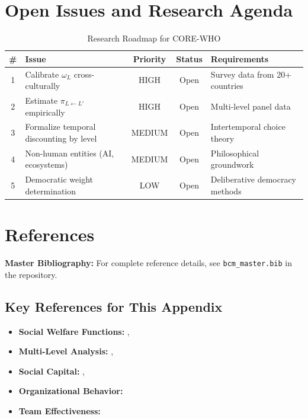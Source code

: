 \section{Open Issues and Research Agenda}
\label{sec:who-open}

\begin{table}[htbp]
\centering
\caption{Research Roadmap for CORE-WHO}
\label{tab:who-roadmap}
\renewcommand{\arraystretch}{1.3}
\begin{tabular}{@{}clccl@{}}
\toprule
\textbf{\#} & \textbf{Issue} & \textbf{Priority} & \textbf{Status} & \textbf{Requirements} \\
\midrule
1 & Calibrate $\omega_L$ cross-culturally & HIGH & Open & Survey data from 20+ countries \\
2 & Estimate $\pi_{L \leftarrow L'}$ empirically & HIGH & Open & Multi-level panel data \\
3 & Formalize temporal discounting by level & MEDIUM & Open & Intertemporal choice theory \\
4 & Non-human entities (AI, ecosystems) & MEDIUM & Open & Philosophical groundwork \\
5 & Democratic weight determination & LOW & Open & Deliberative democracy methods \\
\bottomrule
\end{tabular}
\end{table}


\section{References}
\label{sec:who-references}

\begin{tcolorbox}[colback=blue!5!white, colframe=blue!75!black]
\textbf{Master Bibliography:} For complete reference details, see
\texttt{bcm\_master.bib} in the repository.
\end{tcolorbox}

\subsection{Key References for This Appendix}

\begin{itemize}[nosep]
\item \textbf{Social Welfare Functions:} \citet{sen1970collective}, \citet{arrow1951social}
\item \textbf{Multi-Level Analysis:} \citet{coleman1990foundations}, \citet{raudenbush2002hierarchical}
\item \textbf{Social Capital:} \citet{putnam2000bowling}, \citet{coleman1988social}
\item \textbf{Organizational Behavior:} \citet{kozlowski2000multilevel}
\item \textbf{Team Effectiveness:} \citet{hackman2002groups}
\end{itemize}


